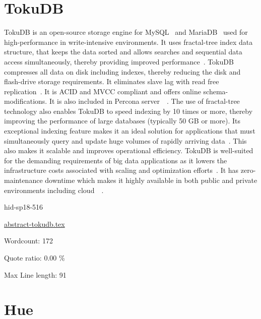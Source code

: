 \section{TokuDB}

TokuDB is an open-source storage engine for 
MySQL~\cite{hid-sp18-516-www-wiki-mysql} and 
MariaDB~\cite{hid-sp18-516-www-wiki-mariadb} used for high-performance in 
write-intensive environments. It uses fractal-tree index data structure, 
that keeps the data sorted and allows searches and sequential data access 
simultaneously, thereby providing improved 
performance~\cite{hid-sp18-516-www-wiki-tokudb}. TokuDB compresses all data 
on disk including indexes, thereby reducing the disk and flash-drive storage 
requirements. It eliminates slave lag with read free 
replication~\cite{hid-sp18-516-www-percona-server-tokudb}. It is ACID and MVCC
compliant and offers online schema-modifications. It is also included in
Percona 
server~\cite{hid-sp18-516-www-percona-tokudb}~\cite{hid-sp18-516-www-wiki-tokudb}. 
The use of fractal-tree technology also enables TokuDB to speed indexing by 10 
times or more, thereby improving the performance of large databases (typically 
50 GB or more). Its exceptional indexing feature makes it an ideal solution for 
applications that must simultaneously query and update huge volumes of rapidly 
arriving data~\cite{hid-sp18-516-www-blackbird-si}. This also makes it scalable 
and improves operational efficiency. TokuDB is well-suited for the demanding
requirements of big data applications as it lowers the infrastructure costs
associated with scaling and optimization
efforts~\cite{hid-sp18-516-www-percona-tokudb}. It has zero-maintenance downtime
which makes it highly available in both public and private environments
including
cloud~\cite{hid-sp18-516-www-percona-server-tokudb}~\cite{hid-sp18-516-www-percona-tokudb}.


\begin{IU}

hid-sp18-516

\href{https://github.com/cloudmesh-community/hid-sp18-516/blob/master//technology/abstract-tokudb.tex}{abstract-tokudb.tex}

 

Wordcount: 172


Quote ratio: 0.00 \%
 
Max Line length: 91
\end{IU}

\section{Hue}


